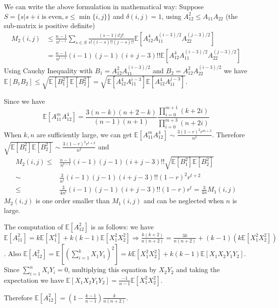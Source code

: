 \documentclass{article}
\def\E{\mathbb{E}}
\begin{document}
We can write the above formulation in mathematical way:
Suppose $S=\{s| s+i \textrm{ is even}, s\leq \min\{i,j\} \}$
and $\delta(i, j)= 1$,
using $A_{12}^2 \leq A_{11}A_{22}$ (the sub-matrix is positive definite)
\begin{align*}
M_2(i, j) & \leq \frac{n-1}{n^{t-1}} \sum_{s \in S}
\frac{(s-1)i!j!}{s!(i-s)!!(j-s)!!}
\E[A_{12}^4 A_{11}^{(i - 3) /2}A_{22}^{(j - 3)/2}]\\
&= \frac{n-1}{n^{t-1}} (i-1)(j-1)(i+j-3)!!
\E[A_{12}^4 A_{11}^{(i - 3) /2}A_{22}^{(j - 3)/2}]
\end{align*}
Using Cauchy Inequality with $B_1 = A_{12}^2 A_{11}^{(i-3)/2}$ and
$B_2 = A_{12}^2 A_{22}^{(i-3)/2}$ we have $\E[B_1B_2] \leq
\sqrt{\E[B_1^2] \E[B_2^2]} =\sqrt{\E[ A_{12}^4 A_{11}^{i-3} ]
\E[ A_{12}^4 A_{11}^{j-3} ]}$.

Since we have
\begin{equation}\label{eq:Am4}
\E[A_{11}^m A_{12}^4] = \frac{3(n-k)(n+2-k)}{(n-1)(n+1)}
\frac{\prod_{i=0}^{m+1} (k+2i)}{\prod_{i=0}^{m+3} (n+2i)}
\end{equation}
When $k, n$ are sufficiently large, we can get $\E[A_{11}^m A_{12}^4] \sim
\frac{3(1-r)^2 r^{m+2}}{n^2}$. Therefore
$ \sqrt{\E[B_1^2] \E[B_2^2]}  \sim  \frac{3(1-r)^2 r^{t+2}}{n^2}$ and
\begin{align*}
M_2(i, j) \leq & \frac{n-1}{n^{t-1}} (i-1)(j-1)(i+j-3)!!
\sqrt{\E[B_1^2] \E[B_2^2]} \\
\sim & \frac{3}{n^t} (i-1)(j-1)(i+j-3)!!
(1-r)^2 r^{t+2} \\
\leq & \frac{3}{4n^t} (i-1)(j-1)(i+j-3)!! (1-r)r^t = \frac{3}{4n} M_1(i,j)
\end{align*}
$M_2(i,j)$ is one order smaller than $M_1(i,j)$ and
can be neglected when $n$ is large.

The computation of $\E[A^2_{12}]$ is as follows:
we have $\E[A_{11}^2] = k\E[X_1^4] + k(k-1)\E[X_1^2 X_2^2] \Rightarrow
\frac{k(k+2)}{n(n+2)} = \frac{3k}{n(n+2)} + (k-1) (k \E[X_1^2 X_2^2])$.
Also $\E[A_{12}^2] = \E[(\sum_{i=1}^k X_1 Y_1)^2]
= k \E[X_1^2X^2_2] + k(k-1)\E[X_1X_2Y_1Y_2]
$.
Since $\sum_{i=1}^n X_i Y_i = 0$, multiplying this equation by $X_2Y_2$ and
taking the expectation
we have $\E[X_1X_2Y_1Y_2] = \frac{-1}{n-1} \E[X_1^2 X_2^2]$.

Therefore $\E[A^2_{12}]=(1-\frac{k-1}{n-1}) \frac{k}{n(n+2)}$.
\end{document}
